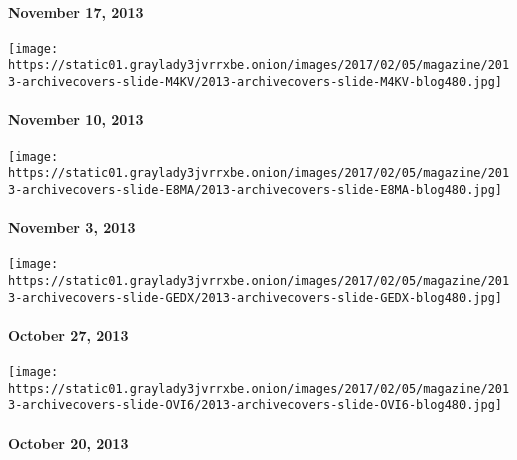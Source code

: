 \hypertarget{november-17-2013}{%
\paragraph{November 17, 2013}\label{november-17-2013}}

\href{http://www.nytimes3xbfgragh.onion/indexes/2013/11/10/magazine/index.html}{}

\texttt{[image: https://static01.graylady3jvrrxbe.onion/images/2017/02/05/magazine/2013-archivecovers-slide-M4KV/2013-archivecovers-slide-M4KV-blog480.jpg]}

\hypertarget{november-10-2013}{%
\paragraph{November 10, 2013}\label{november-10-2013}}

\href{http://www.nytimes3xbfgragh.onion/indexes/2013/11/03/magazine/index.html}{}

\texttt{[image: https://static01.graylady3jvrrxbe.onion/images/2017/02/05/magazine/2013-archivecovers-slide-E8MA/2013-archivecovers-slide-E8MA-blog480.jpg]}

\hypertarget{november-3-2013}{%
\paragraph{November 3, 2013}\label{november-3-2013}}

\href{http://www.nytimes3xbfgragh.onion/indexes/2013/10/27/magazine/index.html}{}

\texttt{[image: https://static01.graylady3jvrrxbe.onion/images/2017/02/05/magazine/2013-archivecovers-slide-GEDX/2013-archivecovers-slide-GEDX-blog480.jpg]}

\hypertarget{october-27-2013}{%
\paragraph{October 27, 2013}\label{october-27-2013}}

\href{http://www.nytimes3xbfgragh.onion/indexes/2013/10/20/magazine/index.html}{}

\texttt{[image: https://static01.graylady3jvrrxbe.onion/images/2017/02/05/magazine/2013-archivecovers-slide-OVI6/2013-archivecovers-slide-OVI6-blog480.jpg]}

\hypertarget{october-20-2013}{%
\paragraph{October 20, 2013}\label{october-20-2013}}

